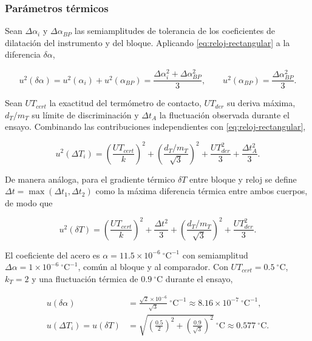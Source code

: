 \subsubsection*{Parámetros térmicos}

Sean $\Delta\alpha_i$ y $\Delta\alpha_{BP}$ las semiamplitudes de tolerancia de los
coeficientes de dilatación del instrumento y del bloque. Aplicando
\eqref{eq:reloj-rectangular} a la diferencia $\delta\alpha$,

\begin{equation}
  u^2(\delta\alpha) = u^2(\alpha_i) + u^2(\alpha_{BP})
  = \frac{\Delta\alpha_i^2 + \Delta\alpha_{BP}^2}{3},
  \qquad
  u^2(\alpha_{BP}) = \frac{\Delta\alpha_{BP}^2}{3}.
  \label{eq:reloj-sigma-dalpha}
\end{equation}

Sean $UT_{cert}$ la exactitud del termómetro de contacto, $UT_{der}$ su deriva
máxima, $d_T/m_T$ su límite de discriminación y $\Delta t_A$ la fluctuación observada
durante el ensayo. Combinando las contribuciones independientes con
\eqref{eq:reloj-rectangular},

\begin{equation}
  u^2(\Delta T_i) = \left(\frac{UT_{cert}}{k}\right)^2
  + \left(\frac{d_T/m_T}{\sqrt{3}}\right)^2
  + \frac{UT_{der}^2}{3} + \frac{\Delta t_A^2}{3}.
  \label{eq:reloj-sigma-deltaT}
\end{equation}

De manera análoga, para el gradiente térmico $\delta T$ entre bloque y reloj se define
$\Delta t = \max(\Delta t_1, \Delta t_2)$ como la máxima diferencia térmica entre ambos
cuerpos, de modo que

\begin{equation}
  u^2(\delta T) = \left(\frac{UT_{cert}}{k}\right)^2
  + \frac{\Delta t^2}{3}
  + \left(\frac{d_T/m_T}{\sqrt{3}}\right)^2
  + \frac{UT_{der}^2}{3}.
  \label{eq:reloj-sigma-deltaT-grad}
\end{equation}

El coeficiente del acero es $\alpha = 11.5\times10^{-6}\ ^\circ\text{C}^{-1}$ con
semiamplitud $\Delta\alpha = 1\times10^{-6}\ ^\circ\text{C}^{-1}$, común al bloque y al
comparador. Con $UT_{cert} = 0.5\ ^\circ\text{C}$, $k_T = 2$ y una fluctuación térmica de
$0.9\ ^\circ\text{C}$ durante el ensayo,

\begin{align}
  u(\delta\alpha) &= \frac{\sqrt{2}\times10^{-6}}{\sqrt{3}}\ ^\circ\text{C}^{-1}
  \approx 8.16\times10^{-7}\ ^\circ\text{C}^{-1},
  \label{eq:reloj-sigma-dalpha-valor} \\
  u(\Delta T_i) = u(\delta T) &=
  \sqrt{\left(\frac{0.5}{2}\right)^2 + \left(\frac{0.9}{\sqrt{3}}\right)^2}\ ^\circ\text{C}
  \approx 0.577\ ^\circ\text{C}.
  \label{eq:reloj-sigma-deltaT-valor}
\end{align}

